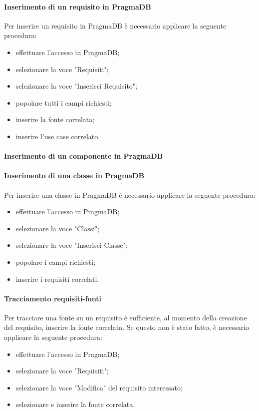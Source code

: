  \paragraph{Inserimento di un requisito in PragmaDB}
 Per inserire un requisito in PragmaDB è necessario applicare la seguente procedura:
 \begin{itemize}
 	\item effettuare l'accesso in PragmaDB;
 	\item selezionare la voce "Requisiti";
 	\item selezionare la voce "Inserisci Requisito";
 	\item popolare tutti i campi richiesti;
 	\item inserire la fonte correlata;
 	\item inserire l'use case correlato.
 \end{itemize}
 \paragraph{Inserimento di un componente in PragmaDB}
 \paragraph{Inserimento di una classe in PragmaDB}
 Per inserire una classe in PragmaDB è necessario applicare la seguente procedura:
 \begin{itemize}
 	\item effettuare l'accesso in PragmaDB;
 	\item selezionare la voce "Classi";
 	\item selezionare la voce "Inserisci Classe";
 	\item popolare i campi richiesti;
 	\item inserire i requisiti correlati.
 \end{itemize}
 \paragraph{Tracciamento requisiti-fonti}
 Per tracciare una fonte su un requisito è sufficiente, al momento della creazione del requisito, inserire la fonte correlata. Se questo non è stato fatto, è necessario applicare la seguente procedura:
 \begin{itemize}
 	\item effettuare l'accesso in PragmaDB;
 	\item selezionare la voce "Requisiti";
 	\item selezionare la voce "Modifica" del requisito interessato;
 	\item selezionare e inserire la fonte correlata.
 \end{itemize}
